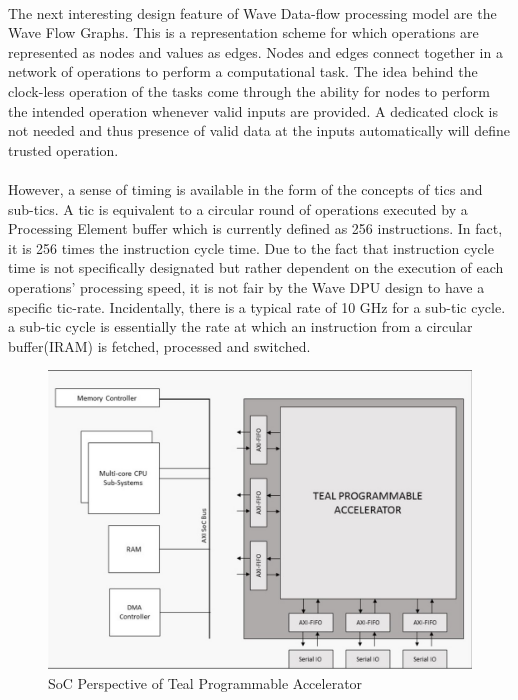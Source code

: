 \paragraph{}
The next interesting design feature of Wave Data-flow processing model are the Wave Flow Graphs. This is a representation scheme for which operations are represented as nodes and values as edges. Nodes and edges connect together in a network of operations to perform a computational task. The idea behind the clock-less operation of the tasks come through the ability for nodes to perform the intended operation whenever valid inputs are provided. A dedicated clock is not needed and thus presence of valid data at the inputs automatically will define trusted operation. 

\paragraph{}
However, a sense of timing is available in the form of the concepts of tics and sub-tics. A tic is equivalent to a circular round of operations executed by a Processing Element buffer which is currently defined as 256 instructions. In fact, it is 256 times the instruction cycle time. Due to the fact that instruction cycle time is not specifically designated but rather dependent on the execution of each operations’ processing speed, it is not fair by the Wave DPU design to have a specific tic-rate. Incidentally, there is a typical rate of 10 GHz for a sub-tic cycle. a sub-tic cycle is essentially the rate at which an instruction from a circular buffer(IRAM) is fetched, processed and switched. 

\begin{figure}[h]
    \centering
    \includegraphics[trim=0cm 0cm 0cm 0cm, clip=true,scale=0.5]{figures/soc_pers.jpg}
    \caption{SoC Perspective of Teal Programmable Accelerator\label{Fig:socpers}}\vspace{-4mm}
    \end{figure}

